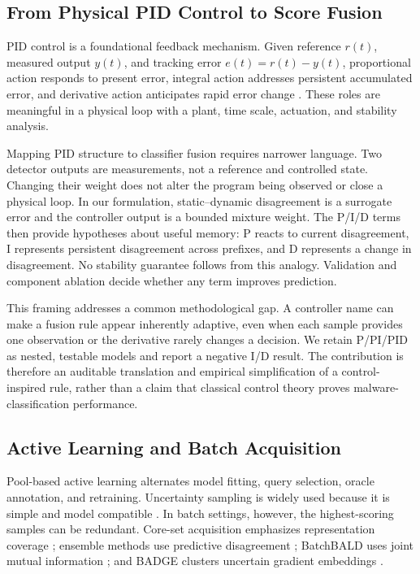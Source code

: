 \subsection{From Physical PID Control to Score Fusion}

PID control is a foundational feedback mechanism. Given reference $r(t)$,
measured output $y(t)$, and tracking error $e(t)=r(t)-y(t)$, proportional action
responds to present error, integral action addresses persistent accumulated
error, and derivative action anticipates rapid error change
\cite{astrom2001future}. These roles are meaningful in a physical loop with a
plant, time scale, actuation, and stability analysis.

Mapping PID structure to classifier fusion requires narrower language. Two
detector outputs are measurements, not a reference and controlled state.
Changing their weight does not alter the program being observed or close a
physical loop. In our formulation, static--dynamic disagreement is a surrogate
error and the controller output is a bounded mixture weight. The P/I/D terms
then provide hypotheses about useful memory: P reacts to current disagreement,
I represents persistent disagreement across prefixes, and D represents a change
in disagreement. No stability guarantee follows from this analogy. Validation
and component ablation decide whether any term improves prediction.

This framing addresses a common methodological gap. A controller name can make a
fusion rule appear inherently adaptive, even when each sample provides one
observation or the derivative rarely changes a decision. We retain P/PI/PID as
nested, testable models and report a negative I/D result. The contribution is
therefore an auditable translation and empirical simplification of a
control-inspired rule, rather than a claim that classical control theory proves
malware-classification performance.

\subsection{Active Learning and Batch Acquisition}

Pool-based active learning alternates model fitting, query selection, oracle
annotation, and retraining. Uncertainty sampling is widely used because it is
simple and model compatible \cite{cohn1996active,settles2009active}. In batch
settings, however, the highest-scoring samples can be redundant. Core-set
acquisition emphasizes representation coverage \cite{sener2018active}; ensemble
methods use predictive disagreement \cite{beluch2018power}; BatchBALD uses joint
mutual information \cite{kirsch2019batchbald}; and BADGE clusters uncertain
gradient embeddings \cite{ash2020deep}.

